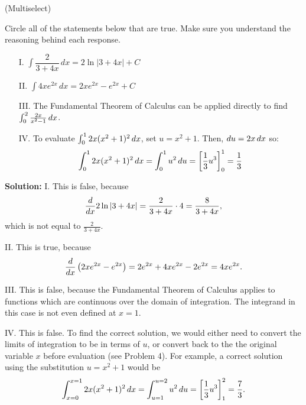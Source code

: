 \documentclass[handout,hints]{ximera}
\begin{document}
\begin{problem}
(Multiselect)

Circle all of the statements below that are true.  Make sure you understand the reasoning behind each response.

\begin{itemize}
\item[I.] $\displaystyle \int \dfrac{2}{3+4x} \, dx = 2\ln|3+4x|+C$

\item[II.] $\displaystyle \int 4xe^{2x} \, dx = 2xe^{2x}-e^{2x}+C$

\item[III.] The Fundamental Theorem of Calculus can be applied directly to find $ \int_0^2 \frac{2x}{x^2-1} \mathop{}\!d x$.

\item[IV.] To evaluate $ \int_0^1 2x(x^2+1)^2 \mathop{}\!d x$, set $u=x^2+1$.  Then, $\mathop{}\!d u = 2x \mathop{}\!d x$ so:
\[ \int_0^1 2x(x^2+1)^2 \mathop{}\!d x = \int_0^1 u^2 \mathop{}\!d u = \bigg[ \frac{1}{3} u^3 \bigg]_0^1 = \frac{1}{3}\]
\end{itemize}

\end{problem}

\textbf{Solution:} I. This is false, because
$$
\frac{\mathop{}\!d}{\mathop{}\!d x} 2 \ln |3+4x| = \frac{2}{3+4x} \cdot 4 = \frac{8}{3+4x},
$$
which is not equal to $\frac{2}{3+4x}$. 

II. This is true, because
$$
\frac{\mathop{}\!d}{\mathop{}\!d x} \left( 2xe^{2x}-e^{2x}\right) = 2 e^{2x} + 4x e^{2x} - 2 e^{2x} = 4x e^{2x}.
$$

III. This is false, because the Fundamental Theorem of Calculus applies to functions which are continuous over the domain of integration. The integrand in this case is not even defined at $x=1$. 

IV. This is false. To find the correct solution, we would either need to convert the limits of integration to be in terms of $u$, or convert back to the the original variable $x$ before evaluation (see Problem 4). For example, a correct solution using the substitution $u = x^2 +1 $ would be 
$$
\int_{x=0}^{x=1} 2x(x^2+1)^2 \mathop{}\!d x = \int_{u=1}^{u=2} u^2 \mathop{}\!d u = \bigg[ \frac{1}{3} u^3 \bigg]_1^2 = \frac{7}{3}.
$$
\end{document}
